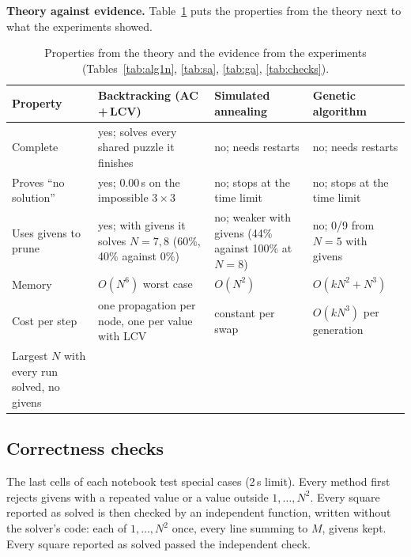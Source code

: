 \documentclass[11pt,a4paper]{article}
\begin{document}
\textbf{Theory against evidence.} Table~\ref{tab:theory} puts the
properties from the theory next to what the experiments showed.

\begin{table}[H]
\centering
\small
\begin{tabular}{@{}>{\raggedright\arraybackslash}p{3.1cm} >{\raggedright\arraybackslash}p{3.9cm} >{\raggedright\arraybackslash}p{3.6cm} >{\raggedright\arraybackslash}p{3.6cm}@{}}
\toprule
Property & Backtracking (AC\,+\,LCV) & Simulated annealing & Genetic algorithm \\
\midrule
\addlinespace[2pt]
Complete & yes; solves every shared puzzle it finishes & no; needs restarts & no; needs restarts \\[3pt]
Proves ``no solution'' & yes; 0.00\,s on the impossible $3\times3$ & no; stops at the time limit & no; stops at the time limit \\[3pt]
Uses givens to prune & yes; with givens it solves $N=7,8$ (60\%, 40\% against 0\%) & no; weaker with givens (44\% against 100\% at $N=8$) & no; 0/9 from $N=5$ with givens \\[3pt]
Memory & $O(N^6)$ worst case & $O(N^2)$ & $O(kN^2+N^3)$ \\[3pt]
Cost per step & one propagation per node, one per value with LCV & constant per swap & $O(kN^3)$ per generation \\[3pt]
Largest $N$ with every run solved, no givens & 6 & 10 & 4 \\
\bottomrule
\end{tabular}
\caption{Properties from the theory and the evidence from the experiments
(Tables~\ref{tab:alg1n}, \ref{tab:sa}, \ref{tab:ga}, \ref{tab:checks}).}
\label{tab:theory}
\end{table}

\subsection{Correctness checks}
\label{sec:checks}

The last cells of each notebook test special cases (2\,s limit). Every
method first rejects givens with a repeated value or a value outside
$1,\dots,N^2$. Every square reported as solved is then checked by an
independent function, written without the solver's code: each of
$1,\dots,N^2$ once, every line summing to $M$, givens kept. Every square
reported as solved passed the independent check.
\end{document}
